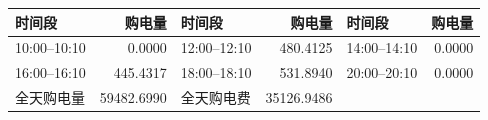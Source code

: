 \begin{tabular}{lr lr lr}
\toprule
时间段 & 购电量 & 时间段 & 购电量 & 时间段 & 购电量 \\
\midrule
10:00--10:10 & 0.0000 & 12:00--12:10 & 480.4125 & 14:00--14:10 & 0.0000 \\
16:00--16:10 & 445.4317 & 18:00--18:10 & 531.8940 & 20:00--20:10 & 0.0000 \\
\midrule
全天购电量 & 59482.6990 & 全天购电费 & 35126.9486 & & \\
\bottomrule
\end{tabular}
